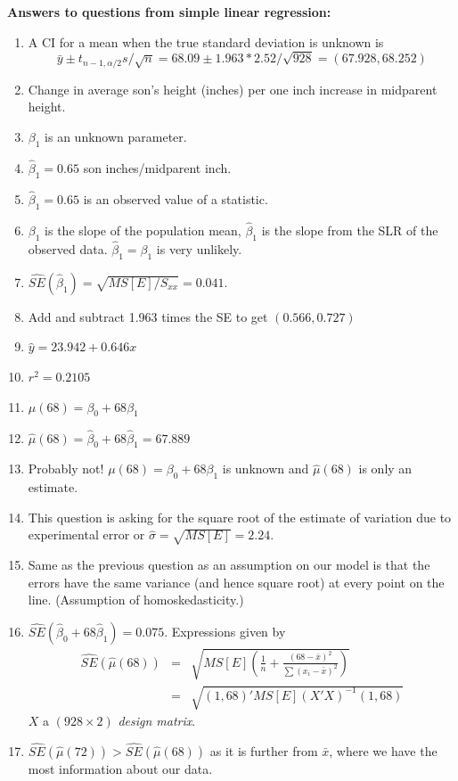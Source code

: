 \documentclass{report}
\begin{document}
\newpage

\textbf{Answers to questions from simple linear regression:}
\begin{enumerate}
\item A CI for a mean when the true standard deviation is unknown is 
$$\bar{y}\pm t_{n-1,\alpha/2}s/\sqrt{n}= 68.09 \pm 1.963*2.52/\sqrt{928}=(67.928,68.252)$$
\item Change in average son's height (inches) per one inch increase in 
midparent height.
\item $\beta_1$ is an unknown parameter. 
\item $\hat\beta_1=0.65$ son inches/midparent inch.
\item $\hat\beta_1=0.65$ is an observed value of a statistic. 
\item 
$\beta_1$ is the slope of the population mean, 
$\hat\beta_1$ is the slope from the SLR of the observed data.
$\hat\beta_1=\beta_1$ is very unlikely.
\item $\widehat{SE}(\hat\beta_1) = \sqrt{MS[E]/S_{xx}}=0.041$.
\item Add and subtract 1.963 times the SE to get $(0.566,0.727)$
\item $\hat{y}=23.942 + 0.646 x$
\item $r^2=0.2105$
\item $\mu(68)=\beta_0+ 68 \beta_1$
\item $\hat{\mu}(68)=\hat\beta_0+68 \hat\beta_1=67.889$
\item Probably not! $\mu(68)=\beta_0+ 68 \beta_1$ is unknown and $\hat{\mu}(68)$ is only an estimate.
\item This question is asking for the square root of the estimate of variation due to experimental error or $\hat{\sigma}=\sqrt{MS[E]}=2.24$.
\item Same as the previous question as an assumption on our model is that the errors have the same variance (and hence square root) at every point on the line.  (Assumption of homoskedasticity.)
\item $\hat{SE}(\hat\beta_0+ 68 \hat\beta_1)=0.075$.
Expressions given by
\begin{eqnarray*}
\widehat{SE}(\hat\mu(68)) &=& \sqrt{MS[E]\left(\frac{1}{n}+\frac{(68-\bar{x})^2}{\sum(x_i-\bar{x})^2}\right)}\\
&=& \sqrt{(1,68)' MS[E] (X'X)^{-1} (1,68)}
\end{eqnarray*}
$X$ a $(928 \times 2)$ {\em design matrix}.
\item $\widehat{SE}(\hat\mu(72)) > \widehat{SE}(\hat\mu(68))$ as it is further from $\bar{x}$, where we have the most information about our data.

\end{enumerate}
\end{document}

